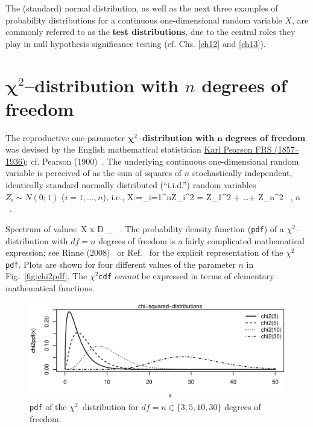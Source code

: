 \vspace{5mm}
\noindent
The (standard) normal distribution, as well as the next three 
examples of probability distributions for a continuous
one-dimensional random variable $X$, are commonly referred to as
the \textbf{test distributions}, due to the central roles they play
in null hypothesis significance testing (cf. Chs. \ref{ch12} and
\ref{ch13}).

\section[$\chi^{2}$--distribution]{
$\boldsymbol{\chi}^{2}$--distribution with $n$ degrees of freedom}
The reproductive one-parameter
$\boldsymbol{\chi}^{2}$\textbf{--distribution with}
$\boldsymbol{n}$ \textbf{degrees of freedom} was
devised by the English mathematical statistician 
\href{http://www-history.mcs.st-and.ac.uk/Biographies/Pearson.html}{Karl Pearson FRS (1857--1936)}; cf. Pearson (1900)~. 
The underlying continuous one-dimensional random variable
%
\be
{}
\ee
%
is perceived of as the sum of squares of $n$ stochastically 
independent, identically standard normally distributed 
(``i.i.d.'') random variables $Z_{i} \sim N(0;1)$ 
($i=1,\ldots,n$), i.e.,
%
\be
X:=\sum_{i=1}^{n}Z_{i}^{2}
= Z_{1}^{2} + \ldots + Z_{n}^{2} \ ,
\quad{}\quad n \in {} \ .
\ee
%

\medskip
\noindent
Spectrum of values:
%
\be
X \mapsto x \in D \subseteq {}_{} \ .
\ee
%
The probability density function (\texttt{pdf}) of a 
$\chi^{2}$--distribution with $df=n$ degrees of freedom is a 
fairly complicated mathematical expression; see Rinne 
(2008)~ or Ref.~ for the
explicit representation of the $\chi^{2}$\texttt{pdf}. Plots are
shown for four different values of the parameter $n$ in
Fig.~\ref{fig:chi2pdf}. The $\chi^{2}$\texttt{cdf} \textit{cannot}
be expressed in terms of elementary mathematical functions.
%
\begin{figure}[!htb]
\begin{center}
\includegraphics[scale=0.8]{chi2pdf.eps}
\end{center}
\caption{\texttt{pdf} of the $\chi^{2}$--distribution for $df=n \in 
\{3, 5, 10, 30\}$ degrees of freedom.}
\end{figure}
%

